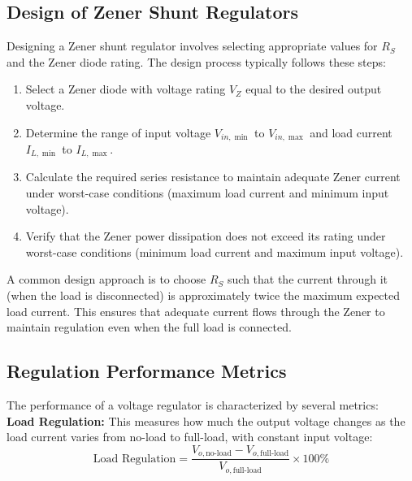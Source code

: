 \documentclass[10pt]{article}
\begin{document}
\subsection{Design of Zener Shunt Regulators}

Designing a Zener shunt regulator involves selecting appropriate values for $R_S$ and the Zener diode rating. The design process typically follows these steps:\\

\begin{enumerate}
    \item Select a Zener diode with voltage rating $V_Z$ equal to the desired output voltage.
    \item Determine the range of input voltage $V_{in,\min}$ to $V_{in,\max}$ and load current $I_{L,\min}$ to $I_{L,\max}$. 
    \item Calculate the required series resistance to maintain adequate Zener current under worst-case conditions (maximum load current and minimum input voltage).
    \item Verify that the Zener power dissipation does not exceed its rating under worst-case conditions (minimum load current and maximum input voltage).
\end{enumerate}

A common design approach is to choose $R_S$ such that the current through it (when the load is disconnected) is approximately twice the maximum expected load current. This ensures that adequate current flows through the Zener to maintain regulation even when the full load is connected.\\

\subsection{Regulation Performance Metrics}

The performance of a voltage regulator is characterized by several metrics:\\

\textbf{Load Regulation:} This measures how much the output voltage changes as the load current varies from no-load to full-load, with constant input voltage:\\

\begin{equation}
    \text{Load Regulation} = \frac{V_{o,\text{no-load}} - V_{o,\text{full-load}}}{V_{o,\text{full-load}}} \times 100\%
    \label{eq:load_reg}
\end{equation}
\end{document}
